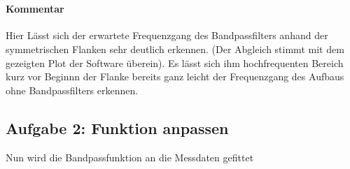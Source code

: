     \begin{center}
    \end{center}
    { \hspace*{\fill} \\}
    
    \hypertarget{kommentar}{%
\paragraph{Kommentar}\label{kommentar}}

Hier Lässt sich der erwartete Frequenzgang des Bandpassfilters anhand
der symmetrischen Flanken sehr deutlich erkennen. (Der Abgleich stimmt
mit dem gezeigten Plot der Software überein). Es lässt sich ihm
hochfrequenten Bereich kurz vor Beginnn der Flanke bereits ganz leicht
der Frequenzgang des Aufbaus ohne Bandpassfilters erkennen.

    \hypertarget{aufgabe-2-funktion-anpassen}{%
\subsection{Aufgabe 2: Funktion
anpassen}\label{aufgabe-2-funktion-anpassen}}

Nun wird die Bandpassfunktion an die Messdaten gefittet

